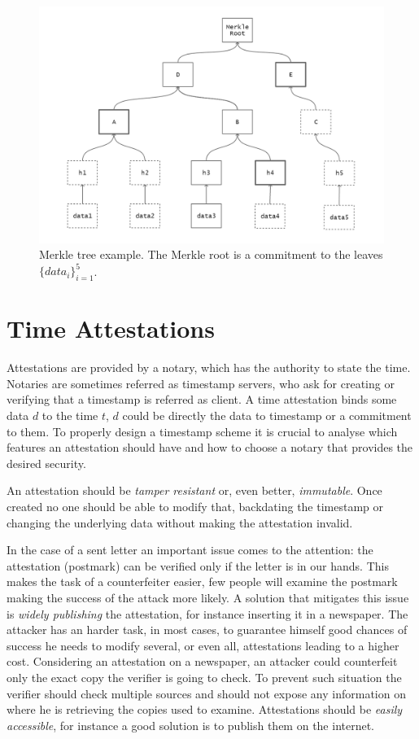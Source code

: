 \begin{figure}
	\begin{center}
		\includegraphics[width=\linewidth]{Images/merkle-tree.png}
		\caption[Merkle tree example]{Merkle tree example. The Merkle root is a commitment to the leaves $\{data_i\}_{i=1}^5$.}
		\label{fig:merkle-tree}
	\end{center}
\end{figure}

\section{Time Attestations}
Attestations are provided by a notary, which has the authority to state the time.
Notaries are sometimes referred as timestamp servers, who ask for creating or verifying that a timestamp is referred as client.
A time attestation binds some data $d$ to the time $t$, $d$ could be directly the data to timestamp or a commitment to them. 
To properly design a timestamp scheme it is crucial to analyse which features an attestation should have and how to choose a notary that provides the desired security.

An attestation should be \textit{tamper resistant} or, even better, \textit{immutable}. Once created no one should be able to modify that, backdating the timestamp or changing the underlying data without making the attestation invalid.

In the case of a sent letter an important issue comes to the attention: the attestation (postmark) can be verified only if the letter is in our hands. This makes the task of a counterfeiter easier, few people will examine the postmark making the success of the attack more likely. A solution that mitigates this issue is \textit{widely publishing} the attestation, for instance inserting it in a newspaper. The attacker has an harder task, in most cases, to guarantee himself good chances of success he needs to modify several, or even all, attestations leading to a higher cost. Considering an attestation on a newspaper, an attacker could counterfeit only the exact copy the verifier is going to check. To prevent such situation the verifier should check multiple sources and should not expose any information on where he is retrieving the copies used to examine. Attestations should be \textit{easily accessible}, for instance a good solution is to publish them on the internet.

